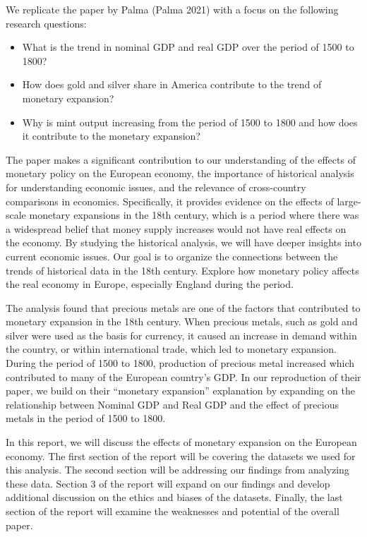 \documentclass[
  letterpaper,
  DIV=11,
  numbers=noendperiod]{scrartcl}
\providecommand{\tightlist}{%
  \setlength{\itemsep}{0pt}\setlength{\parskip}{0pt}}\usepackage{longtable,booktabs,array}
\begin{document}
We replicate the paper by Palma (Palma 2021) with a focus on the
following research questions:

\begin{itemize}
\tightlist
\item
  What is the trend in nominal GDP and real GDP over the period of 1500
  to 1800?
\item
  How does gold and silver share in America contribute to the trend of
  monetary expansion?
\item
  Why is mint output increasing from the period of 1500 to 1800 and how
  does it contribute to the monetary expansion?
\end{itemize}

The paper makes a significant contribution to our understanding of the
effects of monetary policy on the European economy, the importance of
historical analysis for understanding economic issues, and the relevance
of cross-country comparisons in economics. Specifically, it provides
evidence on the effects of large-scale monetary expansions in the 18th
century, which is a period where there was a widespread belief that
money supply increases would not have real effects on the economy. By
studying the historical analysis, we will have deeper insights into
current economic issues. Our goal is to organize the connections between
the trends of historical data in the 18th century. Explore how monetary
policy affects the real economy in Europe, especially England during the
period.

The analysis found that precious metals are one of the factors that
contributed to monetary expansion in the 18th century. When precious
metals, such as gold and silver were used as the basis for currency, it
caused an increase in demand within the country, or within international
trade, which led to monetary expansion. During the period of 1500 to
1800, production of precious metal increased which contributed to many
of the European country's GDP. In our reproduction of their paper, we
build on their ``monetary expansion'' explanation by expanding on the
relationship between Nominal GDP and Real GDP and the effect of precious
metals in the period of 1500 to 1800.

In this report, we will discuss the effects of monetary expansion on the
European economy. The first section of the report will be covering the
datasets we used for this analysis. The second section will be
addressing our findings from analyzing these data. Section 3 of the
report will expand on our findings and develop additional discussion on
the ethics and biases of the datasets. Finally, the last section of the
report will examine the weaknesses and potential of the overall paper.
\end{document}
